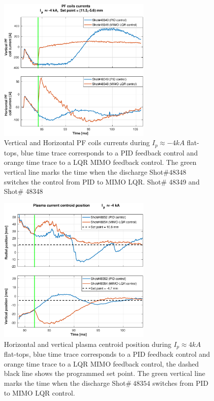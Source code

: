\begin{figure}
	\centering
	\includegraphics[width=0.67\textwidth]{Chp5/PIDvsMIMO_349_348_curr_2.eps}
	\caption{ Vertical and Horizontal PF coils currents during  $I_p\approx -4kA$  flat-tops, blue time trace corresponds to a PID feedback control and orange time trace to a LQR MIMO feedback control. The green vertical line marks the time  when the  discharge Shot$\# 48348$ switches the control from PID to MIMO LQR. Shot$\#$ 48349 and Shot$\#$ 48348}
\end{figure}


\begin{figure}
	\centering
	\includegraphics[width=0.67\textwidth]{Chp5/PIDvsMIMO_352_354_2.eps}
	\caption{Horizontal and vertical plasma centroid position during  $I_p\approx 4kA$  flat-tops, blue time trace corresponds to a PID feedback control and orange time trace to a LQR MIMO feedback control, the dashed black line shows the programmed set point. The green vertical line marks the time  when the  discharge Shot$\# ~48354$ switches  from PID to MIMO LQR control.}
\end{figure}

